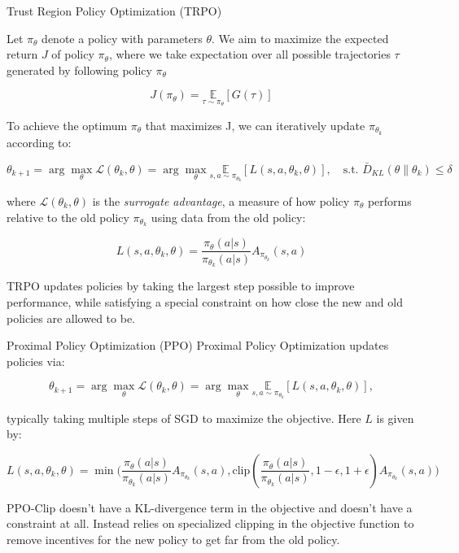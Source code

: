 \documentclass[8pt]{beamer}
\begin{document}
\begin{frame}{Trust Region Policy Optimization (TRPO)}

Let $\pi_\theta$ denote a policy with parameters $\theta$. We aim to maximize the expected return $J$ of policy $\pi_\theta$, where we take expectation over all possible trajectories $\tau$ generated by following policy $\pi_\theta$

$$J(\pi_\theta) = \underset{\tau \sim \pi_\theta}{\mathbb{E}}[G(\tau)]$$

To achieve the optimum $\pi_\theta$ that maximizes J, we can iteratively update $\pi_\theta_k$ according to:

\begin{equation*}
\theta_{k+1} = \arg \max_\theta \mathcal{L}(\theta_k, \theta) = \arg \max_\theta \underset{s,a\sim\pi_{\theta_k}}{\mathbb{E}} \left[L(s, a, \theta_k, \theta)\right], \quad \text{s.t. } \bar{D}_{KL}(\theta\|\theta_k) \leq \delta
\end{equation*}

where $\mathcal{L}(\theta_k, \theta)$ is the \textit{surrogate advantage}, a measure of how policy $\pi_\theta$ performs relative to the old policy $\pi_{\theta_k}$ using data from the old policy:

\begin{equation*}
L(s, a, \theta_k, \theta) = \frac{\pi_\theta(a|s)}{\pi_{\theta_k}(a|s)} A_{\pi_{\theta_k}}(s,a)
\end{equation*}

TRPO updates policies by taking the largest step possible to improve performance, while satisfying a special constraint on how close the new and old policies are allowed to be.
\end{frame}

\begin{frame}{Proximal Policy Optimization (PPO)}
Proximal Policy Optimization updates policies via:

\begin{equation*}
\theta_{k+1} = \arg \max_\theta \mathcal{L}(\theta_k, \theta) = \arg \max_\theta \underset{s,a\sim\pi_{\theta_k}}{\mathbb{E}} \left[L(s, a, \theta_k, \theta)\right],
\end{equation*}

typically taking multiple steps of SGD to maximize the objective. Here $L$ is given by:

\begin{equation}
    L(s, a, \theta_k, \theta) = \min\Bigg(\frac{\pi_\theta(a|s)}{\pi_{\theta_k}(a|s)}A_{\pi_{\theta_k}}(s,a), \text{clip}\left(\frac{\pi_\theta(a|s)}{\pi_{\theta_k}(a|s)}, 1-\epsilon, 1+\epsilon\right)A_{\pi_{\theta_k}}(s,a)\Bigg)
\end{equation}

\vspace{1em}

PPO-Clip doesn’t have a KL-divergence term in the objective and doesn’t have a constraint at all. Instead relies on specialized clipping in the objective function to remove incentives for the new policy to get far from the old policy.

\end{frame}
\end{document}
